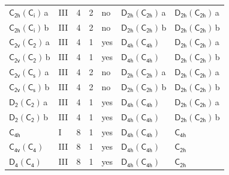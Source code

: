 \documentclass[10pt,a4paper]{article}
\numberwithin{equation}{section}
\newcommand{\grp}[1]{\mathsf{#1}}
\newcommand{\clsletter}[1]{\,{\scriptsize\color{black!55}#1}}
\begin{document}
{\begin{longtable}{@{}llrrlll@{}}
\href{C2h-S2.pdf}{$\grp{C_{2h}}(\grp{C_{i}})$}\clsletter{a} & III & 4 & 2 & no & \href{D2h-C2h.pdf}{$\grp{D_{2h}}(\grp{C_{2h}})$}\clsletter{a} & \href{D2h-C2h.pdf}{$\grp{D_{2h}}(\grp{C_{2h}})$}\clsletter{a}\\
\href{C2h-S2.pdf}{$\grp{C_{2h}}(\grp{C_{i}})$}\clsletter{b} & III & 4 & 2 & no & \href{D2h-C2h.pdf}{$\grp{D_{2h}}(\grp{C_{2h}})$}\clsletter{b} & \href{D2h-C2h.pdf}{$\grp{D_{2h}}(\grp{C_{2h}})$}\clsletter{b}\\
\href{C2v-C2.pdf}{$\grp{C_{2v}}(\grp{C_{2}})$}\clsletter{a} & III & 4 & 1 & yes & \href{D4h-C4h.pdf}{$\grp{D_{4h}}(\grp{C_{4h}})$} & \href{D2h-C2h.pdf}{$\grp{D_{2h}}(\grp{C_{2h}})$}\clsletter{a}\\
\href{C2v-C2.pdf}{$\grp{C_{2v}}(\grp{C_{2}})$}\clsletter{b} & III & 4 & 1 & yes & \href{D4h-C4h.pdf}{$\grp{D_{4h}}(\grp{C_{4h}})$} & \href{D2h-C2h.pdf}{$\grp{D_{2h}}(\grp{C_{2h}})$}\clsletter{b}\\
\href{C2v-C1v.pdf}{$\grp{C_{2v}}(\grp{C_{s}})$}\clsletter{a} & III & 4 & 2 & no & \href{D2h-C2h.pdf}{$\grp{D_{2h}}(\grp{C_{2h}})$}\clsletter{a} & \href{D2h-C2h.pdf}{$\grp{D_{2h}}(\grp{C_{2h}})$}\clsletter{a}\\
\href{C2v-C1v.pdf}{$\grp{C_{2v}}(\grp{C_{s}})$}\clsletter{b} & III & 4 & 2 & no & \href{D2h-C2h.pdf}{$\grp{D_{2h}}(\grp{C_{2h}})$}\clsletter{b} & \href{D2h-C2h.pdf}{$\grp{D_{2h}}(\grp{C_{2h}})$}\clsletter{b}\\
\href{D2-C2.pdf}{$\grp{D_{2}}(\grp{C_{2}})$}\clsletter{a} & III & 4 & 1 & yes & \href{D4h-C4h.pdf}{$\grp{D_{4h}}(\grp{C_{4h}})$} & \href{D2h-C2h.pdf}{$\grp{D_{2h}}(\grp{C_{2h}})$}\clsletter{a}\\
\href{D2-C2.pdf}{$\grp{D_{2}}(\grp{C_{2}})$}\clsletter{b} & III & 4 & 1 & yes & \href{D4h-C4h.pdf}{$\grp{D_{4h}}(\grp{C_{4h}})$} & \href{D2h-C2h.pdf}{$\grp{D_{2h}}(\grp{C_{2h}})$}\clsletter{b}\\
\href{../../../rotation/data/pdf/C4h.pdf}{$\grp{C_{4h}}$} & I & 8 & 1 & yes & \href{D4h-C4h.pdf}{$\grp{D_{4h}}(\grp{C_{4h}})$} & \href{../../../rotation/data/pdf/C4h.pdf}{$\grp{C_{4h}}$}\\
\href{C4v-C4.pdf}{$\grp{C_{4v}}(\grp{C_{4}})$} & III & 8 & 1 & yes & \href{D4h-C4h.pdf}{$\grp{D_{4h}}(\grp{C_{4h}})$} & \href{../../../rotation/data/pdf/C2h.pdf}{$\grp{C_{2h}}$}\\
\href{D4-C4.pdf}{$\grp{D_{4}}(\grp{C_{4}})$} & III & 8 & 1 & yes & \href{D4h-C4h.pdf}{$\grp{D_{4h}}(\grp{C_{4h}})$} & \href{../../../rotation/data/pdf/C2h.pdf}{$\grp{C_{2h}}$}\\

\end{longtable}}
\end{document}
